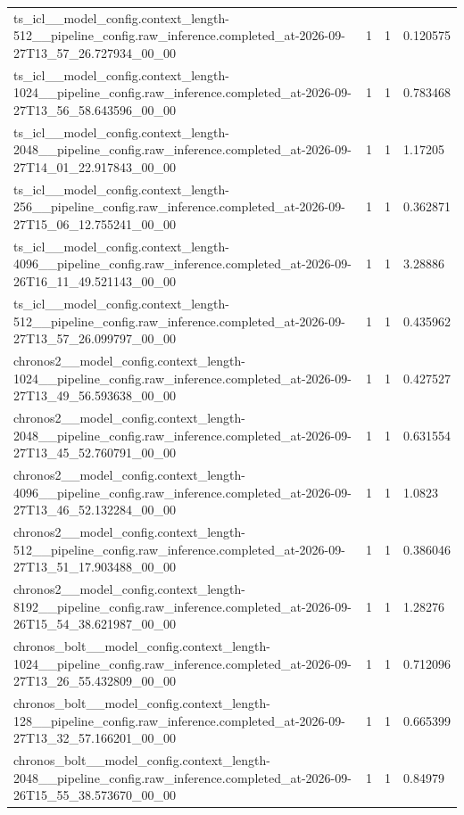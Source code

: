 \begin{tabular}{llll}
ts\_icl\_\_model\_config.context\_length-512\_\_pipeline\_config.raw\_inference.completed\_at-2026-09-27T13\_57\_26.727934\_00\_00 & 1 & 1 & 0.120575 \\
ts\_icl\_\_model\_config.context\_length-1024\_\_pipeline\_config.raw\_inference.completed\_at-2026-09-27T13\_56\_58.643596\_00\_00 & 1 & 1 & 0.783468 \\
ts\_icl\_\_model\_config.context\_length-2048\_\_pipeline\_config.raw\_inference.completed\_at-2026-09-27T14\_01\_22.917843\_00\_00 & 1 & 1 & 1.17205 \\
ts\_icl\_\_model\_config.context\_length-256\_\_pipeline\_config.raw\_inference.completed\_at-2026-09-27T15\_06\_12.755241\_00\_00 & 1 & 1 & 0.362871 \\
ts\_icl\_\_model\_config.context\_length-4096\_\_pipeline\_config.raw\_inference.completed\_at-2026-09-26T16\_11\_49.521143\_00\_00 & 1 & 1 & 3.28886 \\
ts\_icl\_\_model\_config.context\_length-512\_\_pipeline\_config.raw\_inference.completed\_at-2026-09-27T13\_57\_26.099797\_00\_00 & 1 & 1 & 0.435962 \\
chronos2\_\_model\_config.context\_length-1024\_\_pipeline\_config.raw\_inference.completed\_at-2026-09-27T13\_49\_56.593638\_00\_00 & 1 & 1 & 0.427527 \\
chronos2\_\_model\_config.context\_length-2048\_\_pipeline\_config.raw\_inference.completed\_at-2026-09-27T13\_45\_52.760791\_00\_00 & 1 & 1 & 0.631554 \\
chronos2\_\_model\_config.context\_length-4096\_\_pipeline\_config.raw\_inference.completed\_at-2026-09-27T13\_46\_52.132284\_00\_00 & 1 & 1 & 1.0823 \\
chronos2\_\_model\_config.context\_length-512\_\_pipeline\_config.raw\_inference.completed\_at-2026-09-27T13\_51\_17.903488\_00\_00 & 1 & 1 & 0.386046 \\
chronos2\_\_model\_config.context\_length-8192\_\_pipeline\_config.raw\_inference.completed\_at-2026-09-26T15\_54\_38.621987\_00\_00 & 1 & 1 & 1.28276 \\
chronos\_bolt\_\_model\_config.context\_length-1024\_\_pipeline\_config.raw\_inference.completed\_at-2026-09-27T13\_26\_55.432809\_00\_00 & 1 & 1 & 0.712096 \\
chronos\_bolt\_\_model\_config.context\_length-128\_\_pipeline\_config.raw\_inference.completed\_at-2026-09-27T13\_32\_57.166201\_00\_00 & 1 & 1 & 0.665399 \\
chronos\_bolt\_\_model\_config.context\_length-2048\_\_pipeline\_config.raw\_inference.completed\_at-2026-09-26T15\_55\_38.573670\_00\_00 & 1 & 1 & 0.84979 \\

\end{tabular}
